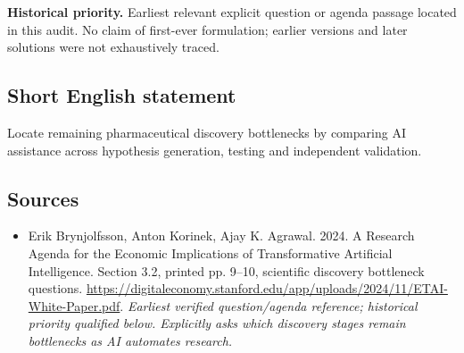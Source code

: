 \documentclass[11pt]{article}
\begin{document}
\par\textbf{Historical priority.} Earliest relevant explicit question or agenda passage located in this audit. No claim of first-ever formulation; earlier versions and later solutions were not exhaustively traced.

\subsection{Short English statement}
Locate remaining pharmaceutical discovery bottlenecks by comparing AI assistance across hypothesis generation, testing and independent validation.

\subsection{Sources}
\begin{itemize}\raggedright
\item[\textnormal{[S1]}]\hypertarget{source:30007692:1}{} Erik Brynjolfsson, Anton Korinek, Ajay K. Agrawal. 2024. A Research Agenda for the Economic Implications of Transformative Artificial Intelligence. Section 3.2, printed pp. 9–10, scientific discovery bottleneck questions.
\url{https://digitaleconomy.stanford.edu/app/uploads/2024/11/ETAI-White-Paper.pdf}.
{\small\textit{Earliest verified question/agenda reference; historical priority qualified below. Explicitly asks which discovery stages remain bottlenecks as AI automates research.}}
\end{itemize}
\end{document}
